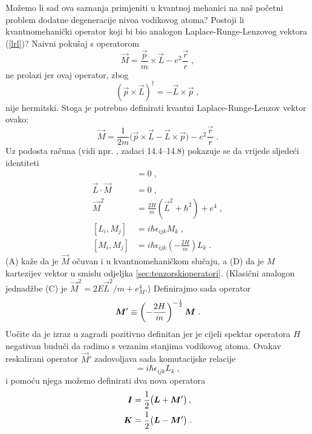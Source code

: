Možemo li sad ova saznanja primjeniti u kvantnoj mehanici na naš
početni problem dodatne degeneracije nivoa vodikovog atoma?
Postoji li kvantnomehanički operator koji bi bio analogon 
Laplace-Runge-Lenzovog vektora (\ref{lrl})? Naivni pokušaj
s operatorom
\begin{equation}
  \vec{M} = \frac{\vec{p}}{m}\times\vec{L} - e^2\frac{\vec{r}}{r} \;,
\end{equation}
ne prolazi jer ovaj operator, zbog 
\begin{displaymath}
    (\vec{p}\times\vec{L})^\dagger = - \vec{L}\times\vec{p} \;,
\end{displaymath}
nije hermitski. Stoga je potrebno definirati kvantni
Laplace-Runge-Lenzov vektor ovako:
\begin{equation}
  \vec{M} = \frac{1}{2m}\big(\vec{p}\times\vec{L}- \vec{L}\times\vec{p}\big) 
- e^2\frac{\vec{r}}{r} \;.
\end{equation}
Uz podosta računa (vidi npr. \cite{Greiner:1989}, zadaci 14.4--14.8) 
pokazuje se da vrijede sljedeći identiteti
\begin{align}
 [\vec{M}, H] &= 0 \;, \tag{A} \\
 \vec{L}\cdot\vec{M} &= 0 \;, \tag{B} \\
\vec{M}^2 &= \frac{2 H}{m}(\vec{L}^2 + \hbar^2) + e^4  \;, \tag{C} \\
 [L_i, M_j] &= i\hbar \epsilon_{ijk} M_k \;, \tag{D} \\
[M_i, M_j] &= i \hbar \epsilon_{ijk} \left(- \frac{2H}{m}\right) L_k \tag{E} \;.
\end{align}
(A) kaže da je $\vec{M}$ očuvan i u kvantnomehaničkom slučaju, a (D) da
je $M$ kartezijev vektor u smislu odjeljka \ref{sec:tenzorskioperatori}.
(Klasični analogon jednadžbe (C) je $\vec{M}^2 = 2E\vec{L}^2/m + e_{M}^4$.)
Definirajmo sada operator 
\begin{equation}
\vec{M}' \equiv \left(- \frac{2H}{m}\right)^{-\fhalf} \vec{M} \;.
\end{equation}
Uočite da je izraz u zagradi pozitivno definitan jer je cijeli spektar operatora $H$
negativan buduči da radimo s vezanim stanjima vodikovog atoma.
Ovakav reskalirani operator $\vec{M}'$ zadovoljava sada komutacijske
relacije
\begin{equation}
[M'_i, M'_j] = i \hbar \epsilon_{ijk}  L_k \tag{E'} \;,
\end{equation}
i pomoću njega možemo definirati dva nova operatora
\begin{align}
\vec{I} &= \fhalf \big(\vec{L} + \vec{M}'\big) \,, \\
\vec{K} &= \fhalf \big(\vec{L} - \vec{M}'\big) \;.
\end{align}
